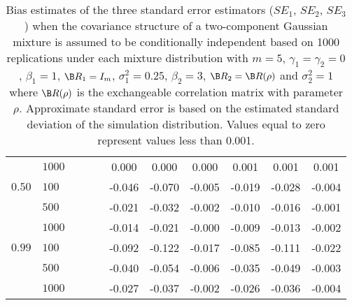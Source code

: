 \begin{landscape}
\begin{table}[ht]
\begin{center}
\begin{tabular}{llccccccccc}
    & $1000$ &   &   &   & 0.000 & 0.000 & 0.000 & 0.001 & 0.001 & 0.001 \\ 
  $0.50$ & $100$ &   &   &   & -0.046 & -0.070 & -0.005 & -0.019 & -0.028 & -0.004 \\ 
    & $500$ &   &   &   & -0.021 & -0.032 & -0.002 & -0.010 & -0.016 & -0.001 \\ 
    & $1000$ &   &   &   & -0.014 & -0.021 & -0.000 & -0.009 & -0.013 & -0.002 \\ 
  $0.99$ & $100$ &   &   &   & -0.092 & -0.122 & -0.017 & -0.085 & -0.111 & -0.022 \\ 
    & $500$ &   &   &   & -0.040 & -0.054 & -0.006 & -0.035 & -0.049 & -0.003 \\ 
    & $1000$ &   &   &   & -0.027 & -0.037 & -0.002 & -0.026 & -0.036 & -0.004 \\ 
   \hline\end{tabular}
\caption{Bias estimates of the three standard error estimators ($SE_1$, $SE_2$, $SE_3$) when the covariance structure of a two-component Gaussian mixture is assumed to be conditionally independent based on 1000 replications under each mixture distribution with $m=5$, $\gamma_1=\gamma_2=0$, $\beta_{1}=1$, $\B R_1=I_{m}$, $\sigma_1^{2}=0.25$, $\beta_2=3$, $\B R_2=\B R(\rho)$ and $\sigma_2^{2}=1$ where $\B R(\rho)$ is the exchangeable correlation matrix with parameter $\rho$. Approximate standard error is based on the estimated standard deviation of the simulation distribution. Values equal to zero represent values less than 0.001.}
\label{tab:dep2}
\end{center}
\end{table}
\end{landscape}
